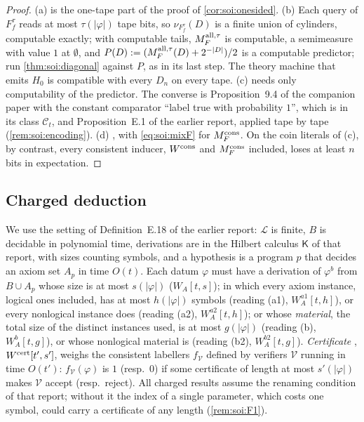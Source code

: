 \begin{proof}
(a) is the one-tape part of the proof of \cref{cor:soi:onesided}. (b) Each query of $F^\tau_f$ reads at most $\tau(\lvert\varphi\rvert)$ tape bits, so $\nu_{F^\tau_f}(D)$ is a finite union of cylinders, computable exactly; with computable tails, $M_{F}^{\mathrm{all},\tau}$ is computable, a semimeasure with value $1$ at $\emptyset$, and $P(D):=(M_{F}^{\mathrm{all},\tau}(D)+2^{-\lvert D\rvert})/2$ is a computable predictor; run \cref{thm:soi:diagonal} against $P$, as in its last step. The theory machine that emits $H_0$ is compatible with every $D_n$ on every tape. (c)  needs only computability of the predictor. The converse is Proposition~9.4 of the companion paper with the constant comparator ``label true with probability $1$'', which is in its class $\mathcal C_t$, and Proposition~E.1 of the earlier report, applied tape by tape (\cref{rem:soi:encoding}). (d) , with \eqref{eq:soi:mixF} for $M_{F}^{\mathrm{cons}}$. On the coin literals of (c), by contrast, every consistent inducer, $W^{\mathrm{cons}}$ and $M_{F}^{\mathrm{cons}}$ included, loses at least $n$ bits in expectation.
\end{proof}

\subsection{Charged deduction}\label{sec:app:soi:charged}

We use the setting of Definition~E.18 of the earlier report: $\mathcal L$ is finite, $B$ is decidable in polynomial time, derivations are in the Hilbert calculus $\mathsf K$ of that report, with sizes counting symbols, and a hypothesis is a program $p$ that decides an axiom set $A_p$ in time $O(t)$. Each datum $\varphi$ must have a derivation of $\varphi^b$ from $B\cup A_p$ whose size is at most $s(\lvert\varphi\rvert)$ ($W_A[t,s]$); in which every axiom instance, logical ones included, has at most $h(\lvert\varphi\rvert)$ symbols (reading (a1), $W_A^{a1}[t,h]$), or every nonlogical instance does (reading (a2), $W_A^{a2}[t,h]$); or whose \emph{material}, the total size of the distinct instances used, is at most $g(\lvert\varphi\rvert)$ (reading (b), $W_A^{b}[t,g]$), or whose nonlogical material is (reading (b2), $W_A^{b2}[t,g]$). \emph{Certificate} \SOIabbr, $W^{\mathrm{cert}}[t',s']$, weighs the consistent labellers $f_{\mathcal V}$ defined by verifiers $\mathcal V$ running in time $O(t')$: $f_{\mathcal V}(\varphi)$ is $1$ (resp.\ $0$) if some certificate of length at most $s'(\lvert\varphi\rvert)$ makes $\mathcal V$ accept (resp.\ reject). All charged results assume the renaming condition of that report; without it the index of a single parameter, which costs one symbol, could carry a certificate of any length (\cref{rem:soi:F1}).

